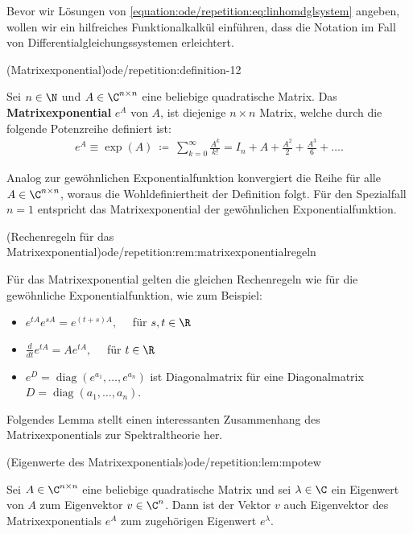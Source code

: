 \documentclass[letterpaper,10pt,german]{jupyterBook}
\begin{document}
\par
Bevor wir Lösungen von \eqref{equation:ode/repetition:eq:linhomdglsystem} angeben, wollen wir ein hilfreiches Funktionalkalkül einführen, dass die Notation im Fall von Differentialgleichungssystemen erleichtert.
\begin{definition}{(Matrixexponential)}{ode/repetition:definition-12}



\par
Sei \(n \in \N\) und \(A \in \C^{n \times n}\) eine beliebige quadratische Matrix.
Das \textbf{Matrixexponential} \(e^A\) von \(A\), ist diejenige \(n\times n\) Matrix, welche durch die folgende Potenzreihe definiert ist:
\begin{align*}
e^A \equiv \exp(A) \ \coloneqq \ \sum_{k=0}^\infty \frac{A^k}{k!} = I_n + A + \frac{A^2}{2} + \frac{A^3}{6} + \ldots.
\end{align*}
\par
Analog zur gewöhnlichen Exponentialfunktion konvergiert die Reihe für alle \(A \in \C^{n \times n}\), woraus die Wohldefiniertheit der Definition folgt.
Für den Spezialfall \(n=1\) entspricht das Matrixexponential der gewöhnlichen Exponentialfunktion.
\end{definition}
\begin{remark}{(Rechenregeln für das Matrixexponential)}{ode/repetition:rem:matrixexponentialregeln}



\par
Für das Matrixexponential gelten die gleichen Rechenregeln wie für die gewöhnliche Exponentialfunktion, wie zum Beispiel:
\begin{itemize}
\item {} 
\par
\(e^{tA}e^{sA} = e^{(t+s)A}, \quad\) für \(s,t \in \R\)

\item {} 
\par
\(\frac{d}{dt} e^{tA} = Ae^{tA}, \quad\) für \(t \in \R\)

\item {} 
\par
\( e^{D} = \operatorname{diag}(e^{a_1}, \ldots, e^{a_n})\) ist Diagonalmatrix für eine Diagonalmatrix \(D = \operatorname{diag}(a_1, \ldots, a_n)\).

\end{itemize}
\end{remark}

\par
Folgendes Lemma stellt einen interessanten Zusammenhang des Matrixexponentials zur Spektraltheorie her.
\begin{lemma}{(Eigenwerte des Matrixexponentials)}{ode/repetition:lem:mpotew}



\par
Sei \(A \in \C^{n\times n}\) eine beliebige quadratische Matrix und sei \(\lambda \in \C\) ein Eigenwert von \(A\) zum
Eigenvektor \(v \in \C^n\).
Dann ist der Vektor \(v\) auch Eigenvektor des Matrixexponentials \(e^A\) zum zugehörigen Eigenwert \(e^\lambda\).
\end{lemma}
\end{document}
